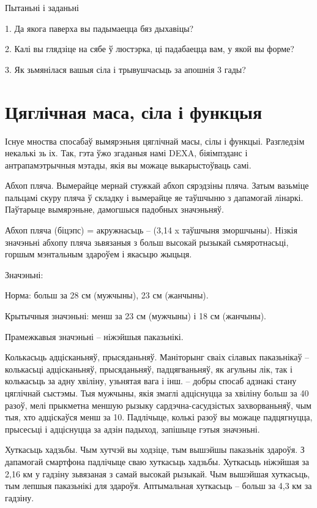 Пытаньні і заданьні

1. Да якога паверха вы падымаецца бяз дыхавіцы?

2. Калі вы глядзіце на сябе ў люстэрка, ці падабаецца вам, у якой вы форме?

3. Як зьмянілася вашыя сіла і трывушчасьць за апошнія 3 гады?


\section{Цяглічная маса, сіла і функцыя}

Існуе мноства спосабаў вымярэньня цяглічнай масы, сілы і функцыі. Разгледзім некалькі зь іх. Так, гэта ўжо згаданыя намі DEXA, біяімпэданс і антрапамэтрычныя мэтады, якія вы можаце выкарыстоўваць самі.

Абхоп пляча. Вымерайце мернай стужкай абхоп сярэдзіны пляча. Затым вазьміце пальцамі скуру пляча ў складку і вымерайце яе таўшчыню з дапамогай лінаркі. Паўтарыце вымярэньне, дамогшыся падобных значэньняў. 

Абхоп пляча (біцэпс) = акружнасьць – (3,14 x таўшчыня зморшчыны). Нізкія значэньні абхопу пляча зьвязаныя з больш высокай рызыкай сьмяротнасьці, горшым мэнтальным здароўем і якасьцю жыцьця.

Значэньні: 

Норма: больш за 28 см (мужчыны), 23 см (жанчыны). 

Крытычныя значэньні: менш за 23 см (мужчыны) і 18 см (жанчыны). 

Прамежкавыя значэньні – ніжэйшыя паказьнікі.

Колькасьць адцісканьняў, прысяданьняў. Маніторынг сваіх сілавых паказьнікаў – колькасьці адцісканьняў, прысяданьняў, падцягваньняў, як агульны лік, так і колькасьць за адну хвіліну, узьнятая вага і інш. – добры спосаб адзнакі стану цяглічнай сыстэмы. Тыя мужчыны, якія змаглі адціснуцца за хвіліну больш за 40 разоў, мелі прыкметна меншую рызыку сардэчна-сасудзістых захворваньняў, чым тыя, хто адціскаўся менш за 10. Падлічыце, колькі разоў вы можаце падцягнуцца, прысесьці і адціснуцца за адзін падыход, запішыце гэтыя значэньні. 

Хуткасьць хадзьбы. Чым хутчэй вы ходзіце, тым вышэйшы паказьнік здароўя. З дапамогай смартфона падлічыце сваю хуткасьць хадзьбы. Хуткасьць ніжэйшая за 2,16 км у гадзіну зьвязаная з самай высокай рызыкай. Чым вышэйшая хуткасьць, тым лепшыя паказьнікі для здароўя. Аптымальная хуткасьць – больш за 4,3 км за гадзіну.

